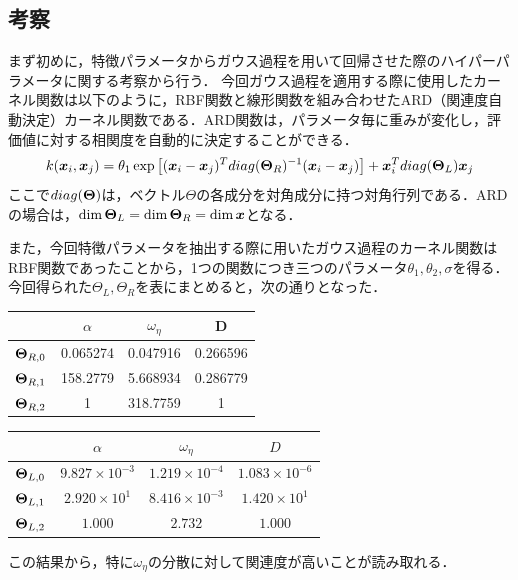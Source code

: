 \documentclass[16.7pt]{jsarticle}
\begin{document}
		\subsection{考察}
		まず初めに，特徴パラメータからガウス過程を用いて回帰させた際のハイパーパラメータに関する考察から行う．
				今回ガウス過程を適用する際に使用したカーネル関数は以下のように，RBF関数と線形関数を組み合わせたARD（関連度自動決定）カーネル関数である．ARD関数は，パラメータ毎に重みが変化し，評価値に対する相関度を自動的に決定することができる．
				\begin{equation}\label{eq:ARD_Kernel}
					k(\boldsymbol{x}_i,\boldsymbol{x}_j) = \theta_1 \exp \left[(\boldsymbol{x}_i - \boldsymbol{x}_j)^T  diag(\boldsymbol{\Theta}_R)^{-1}  (\boldsymbol{x}_i - \boldsymbol{x}_j) \right] + \boldsymbol{x}_i^T diag(\boldsymbol{\Theta}_L) \boldsymbol{x}_j
				\end{equation}
			ここで$ diag(\boldsymbol{\Theta}) $は，ベクトル$ \Theta $の各成分を対角成分に持つ対角行列である．ARDの場合は，$ \dim \boldsymbol{\Theta}_L = \dim \boldsymbol{\Theta}_R =  \dim \boldsymbol{x} $となる．
		
				また，今回特徴パラメータを抽出する際に用いたガウス過程のカーネル関数はRBF関数であったことから，1つの関数につき三つのパラメータ$ \theta_1,\theta_2,\sigma $を得る．
				今回得られた$ \Theta_L,\Theta_R $を表にまとめると，次の通りとなった．
		
				\begin{table}[h]
					\centering
					\begin{tabular}{|c|c|c|c|}
						\hline
						& $\alpha$ & $\omega_{\eta}$ & D        \\ \hline
						$\boldsymbol{\Theta}_{R,0}$        & 0.065274                      & 0.047916                             & 0.266596               \\ \hline
						$\boldsymbol{\Theta}_{R,1}$ & 158.2779                      & 5.668934                             & 0.286779               \\ \hline
						$\boldsymbol{\Theta}_{R,2}$ & 1                             & 318.7759                             & 1                    \\ \hline
		\end{tabular}
				\end{table}
		
				\begin{table}[h]
					\centering
					\begin{tabular}{|c|c|c|c|}
						\hline
						& $\alpha$ & $\omega_{\eta}$ & $D$       \\ \hline
						$\boldsymbol{\Theta}_{L,0}$        & $9.827\times 10^{-3}$ & $1.219\times 10^{-4}$        & $1.083\times 10^{-6}$ \\ \hline
						$\boldsymbol{\Theta}_{L,1}$ & $2.920\times 10^{1}$ & $8.416\times 10^{-3}$        & $1.420\times 10^{1}$ \\ \hline
						$\boldsymbol{\Theta}_{L,2}$ & $1.000$    & $2.732$        & $1.000$   \\ \hline
					\end{tabular}
				\end{table}
		この結果から，特に$ \omega_{\eta} $の分散に対して関連度が高いことが読み取れる．
		
\end{document}
